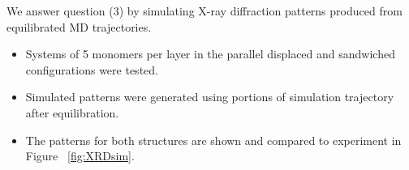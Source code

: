 \documentclass{article}
\newcommand{\angstrom}{\textup{\AA}}
\begin{document}


  We answer question (3) by simulating X-ray diffraction patterns produced from
  equilibrated MD trajectories.
  \begin{itemize}
	\item Systems of 5 monomers per layer in the parallel displaced and sandwiched
	configurations were tested.
        \item Simulated patterns were generated using portions of simulation
        trajectory after equilibration.
        \item The patterns for both structures are shown and compared to experiment
	in Figure ~\ref{fig:XRDsim}.
  \end{itemize}
%
\end{document}
